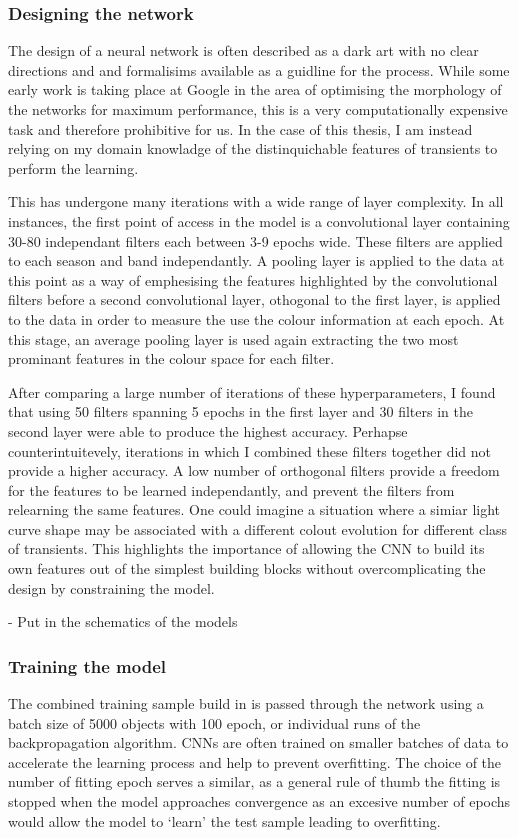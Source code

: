 \subsubsection{Designing the network} \label{sec:AGNNoiseModel}
The design of a neural network is often described as a dark art with no clear directions and and formalisims available as a guidline for the process. While some early work is taking place at Google in the area of optimising the morphology of the networks for maximum performance, this is a very computationally expensive task and therefore prohibitive for us. In the case of this thesis, I am instead relying on my domain knowladge of the distinquichable features of transients to perform the learning.

This has undergone many iterations with a wide range of layer complexity. In all instances, the first point of access in the model is a convolutional layer containing 30-80 independant filters each between 3-9 epochs wide. These filters are applied to each season and band independantly. A pooling layer is applied to the data at this point as a way of emphesising the features highlighted by the convolutional filters before a second convolutional layer, othogonal to the first layer, is applied to the data in order to measure the use the colour information at each epoch. At this stage, an average pooling layer is used again extracting the two most prominant features in the colour space for each filter.

After comparing a large number of iterations of these hyperparameters, I found that using 50 filters spanning 5 epochs in the first layer and 30 filters in the second layer were able to produce the highest accuracy. Perhapse counterintuitevely, iterations in which I combined these filters together did not provide a higher accuracy. A low number of orthogonal filters provide a freedom for the features to be learned independantly, and prevent the filters from relearning the same features. One could imagine a situation where a simiar light curve shape may be associated with a different colout evolution for different class of transients. This highlights the importance of allowing the CNN to build its own features out of the simplest building blocks without overcomplicating the design by constraining the model.

- Put in the schematics of the models

\subsubsection{Training the model}
The combined training sample build in  is passed through the network using a batch size of 5000 objects with 100 epoch, or individual runs of the backpropagation algorithm. CNNs are often trained on smaller batches of data to accelerate the learning process and help to prevent overfitting. The choice of the number of fitting epoch serves a similar, as a general rule of thumb the fitting is stopped when the model approaches convergence as an excesive number of epochs would allow the model to `learn' the test sample leading to overfitting.


